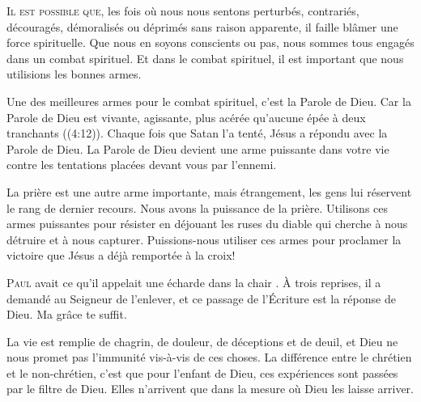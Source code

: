 \lettrine{I}{l est possible que,}
 les fois où nous nous sentons perturbés, contrariés, découragés,
 démoralisés ou déprimés sans raison apparente, il faille blâmer
 une force spirituelle.
 Que nous en soyons conscients ou pas, nous sommes tous engagés
 dans un combat spirituel. Et dans le combat spirituel,
 il est important que nous utilisions les bonnes armes.

Une des meilleures armes pour le combat spirituel, c'est la Parole de Dieu.
 \og Car la Parole de Dieu est vivante, agissante, plus acérée
 qu'aucune épée à deux tranchants \fg{} ((4:12)).
 Chaque fois que Satan l'a tenté, Jésus a répondu avec la Parole de Dieu.
 La Parole de Dieu devient une arme puissante dans votre vie
 contre les tentations placées devant vous par l'ennemi.


La prière est une autre arme importante, mais étrangement,
 les gens lui réservent le rang de dernier recours.
 Nous avons la puissance de la prière. Utilisons ces armes puissantes
 pour résister en déjouant les ruses du diable qui cherche à nous détruire
 et à nous capturer.
 Puissions-nous utiliser ces armes pour proclamer la victoire
 que Jésus a déjà remportée à la croix!

\dvrule






\lettrine{P}{aul} avait ce qu'il appelait une \og écharde dans la chair \fg{}.
 À trois reprises, il a demandé au Seigneur de l'enlever,
 et ce passage de l'Écriture est la réponse de Dieu.
 \og Ma grâce te suffit. \fg{}

La vie est remplie de chagrin, de douleur, de déceptions et de deuil,
 et Dieu ne nous promet pas l'immunité vis-à-vis de ces choses.
 La différence entre le chrétien et le non-chrétien,
 c'est que pour l'enfant de Dieu, ces expériences sont passées
 par le filtre de Dieu. Elles n'arrivent que dans la mesure
 où Dieu les laisse arriver.

